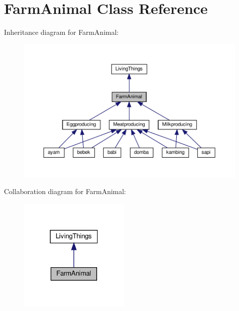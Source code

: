 \hypertarget{classFarmAnimal}{}\section{Farm\+Animal Class Reference}
\label{classFarmAnimal}


Inheritance diagram for Farm\+Animal\+:
\nopagebreak
\begin{figure}[H]
\begin{center}
\leavevmode
\includegraphics[width=350pt]{classFarmAnimal__inherit__graph}
\end{center}
\end{figure}


Collaboration diagram for Farm\+Animal\+:
\nopagebreak
\begin{figure}[H]
\begin{center}
\leavevmode
\includegraphics[width=151pt]{classFarmAnimal__coll__graph}
\end{center}
\end{figure}
